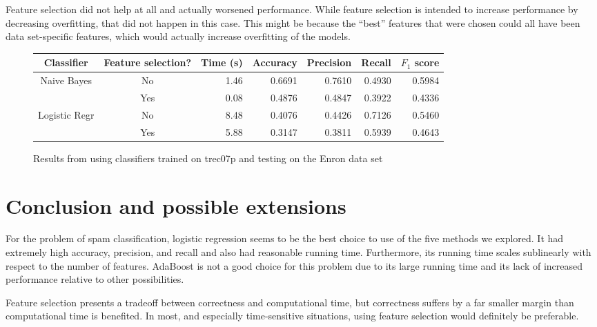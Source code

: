 \documentclass{article} %
\begin{document}
Feature selection did not help at all and actually worsened performance. While feature selection is intended to increase performance by decreasing overfitting, that did not happen in this case. This might be because the ``best'' features that were chosen could all have been data set-specific features, which would actually increase overfitting of the models. 

\begin{figure}[h]
  \begin{tabular}[h]{ | c | c | r | r | r | r | r | }
    \hline
    Classifier    & Feature selection? & Time (s) & Accuracy & Precision & Recall & $F_1$ score  \\ \hline
    Naive Bayes   & No                 & 1.46     & 0.6691   & 0.7610    & 0.4930 & 0.5984       \\ \cline{2-7}  
                  & Yes                & 0.08     & 0.4876   & 0.4847    & 0.3922 & 0.4336       \\ \hline
    Logistic Regr & No                 & 8.48     & 0.4076   & 0.4426    & 0.7126 & 0.5460       \\ \cline{2-7}
                  & Yes                & 5.88     & 0.3147   & 0.3811    & 0.5939 & 0.4643       \\ \hline
  \end{tabular}
  \caption{Results from using classifiers trained on trec07p and testing on the Enron data set}
  \label{fig:table_comparison}
\end{figure}

\section{Conclusion and possible extensions}

For the problem of spam classification, logistic regression seems to be the best choice to use of the five methods we explored. It had extremely high accuracy, precision, and recall and also had reasonable running time. Furthermore, its running time scales sublinearly with respect to the number of features. AdaBoost is not a good choice for this problem due to its large running time and its lack of increased performance relative to other possibilities. 

Feature selection presents a tradeoff between correctness and computational time, but correctness suffers by a far smaller margin than computational time is benefited. In most, and especially time-sensitive situations, using feature selection would definitely be preferable.
\end{document}
